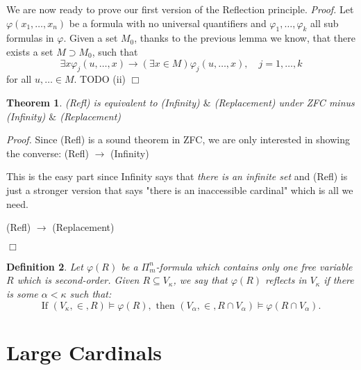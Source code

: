 \documentclass[12pt,a4paper]{article}
\newtheorem{theorem}{Theorem}[section]
\newtheorem{definition}[theorem]{Definition}
\newenvironment{proof}
{\noindent \textit{Proof.}}
{\hspace*{\fill} $\Box$}
\newcommand{\sub}{\subseteq}
\newcommand{\then}{\rightarrow}
\begin{document}
\newline
\newline
We are now ready to prove our first version of the Reflection principle.
\begin{proof}
Let $\varphi(x_1,\ldots,x_n)$ be a formula with no universal quantifiers and $\varphi_1,\ldots,\varphi_k$ all sub formulas in $\varphi$. 
Given a set $M_0$, thanks to the previous lemma we know, that there exists a set $M \supset M_0$, such that
\begin{equation}
\exists x \varphi_j(u,\ldots,x) \to (\exists x \in M) \varphi_j (u,\ldots,x),\quad j = 1,\ldots,k
\end{equation}
for all $u,\ldots \in M$.
\newline\newline
TODO (ii)
\end{proof}

\medskip

\begin{theorem}
(Refl) is equivalent to (Infinity) $\&$ (Replacement) under ZFC minus (Infinity) $\&$ (Replacement)
\end{theorem}

\begin{proof}
Since (Refl) is a sound theorem in ZFC, we are only interested in showing the converse:
\medskip
(Refl) $\then$ (Infinity)

This is the easy part since Infinity says that \emph{there is an infinite set} and (Refl) is just a stronger version that says "there is an inaccessible cardinal" which is all we need.

\medskip

(Refl) $\then$ (Replacement)


\end{proof}


\begin{definition}\label{def:reflection_2}
Let $\varphi(R)$ be a $\Pi^n_m$-formula which contains only one free variable $R$ which is second-order. Given $R \sub V_\kappa$, we say that $\varphi(R)$ reflects in $V_\kappa$ if there is some $\alpha<\kappa$ such that:
\begin{equation}
\mbox{If }(V_\kappa,\in, R)\models \varphi(R), \mbox{ then }(V_\alpha,\in, R\cap V_\alpha) \models \varphi(R\cap V_\alpha).
\end{equation}
\end{definition}

\newpage
\section{Large Cardinals}
\end{document}
